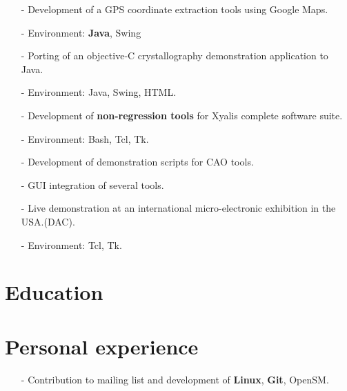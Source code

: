 \documentclass[10pt,a4paper]{moderncv}
\begin{document}
{
\begin{itemize}
\item[-]{Development of a GPS coordinate extraction tools using Google Maps.}
\item[-]{Environment: \textbf{Java}, Swing}
\end{itemize}
}

{
\begin{itemize}
\item[-]{Porting of an objective-C crystallography demonstration application to Java.}
\item[-]{Environment: Java, Swing, HTML.}
\end{itemize}
}

{
\begin{itemize}
\item[-]{Development of \textbf {non-regression tools} for Xyalis complete software suite.}
\item[-]{Environment: Bash, Tcl, Tk.}
\end{itemize}
}

{
\begin{itemize}
\item[-]{Development of demonstration scripts for CAO tools.}
\item[-]{GUI integration of several tools.}
\item[-]{Live demonstration at an international micro-electronic exhibition in the USA.(DAC).}
\item[-]{Environment: Tcl, Tk.}
\end{itemize}
}

\section{Education}

\section{Personal experience}
{
\begin{itemize}
\item[-]{Contribution to mailing list and development of \textbf{Linux}, \textbf{Git}, OpenSM.}
\end{itemize}
}
\end{document}
